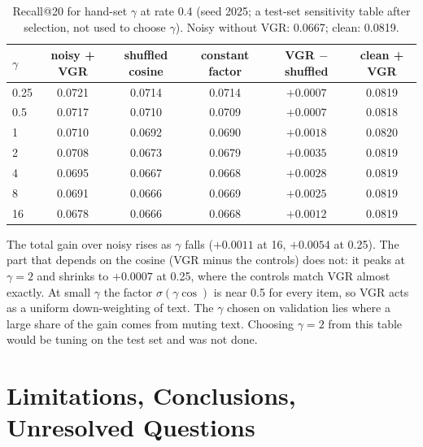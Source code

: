 \documentclass[conference]{IEEEtran}
\begin{document}
\begin{table}[!t]
\centering\footnotesize
\caption{Recall@20 for hand-set $\gamma$ at rate 0.4 (seed 2025; a test-set sensitivity table after selection, not used to choose $\gamma$). Noisy without VGR: 0.0667; clean: 0.0819.}
\label{tab:gamma}
\begin{tabular}{@{}lccccc@{}}
\toprule
$\gamma$ & noisy + VGR & shuffled cosine & constant factor & VGR $-$ shuffled & clean + VGR \\
\midrule
0.25 & 0.0721 & 0.0714 & 0.0714 & $+0.0007$ & 0.0819 \\
0.5 & 0.0717 & 0.0710 & 0.0709 & $+0.0007$ & 0.0818 \\
1 & 0.0710 & 0.0692 & 0.0690 & $+0.0018$ & 0.0820 \\
2 & 0.0708 & 0.0673 & 0.0679 & $+0.0035$ & 0.0819 \\
4 & 0.0695 & 0.0667 & 0.0668 & $+0.0028$ & 0.0819 \\
8 & 0.0691 & 0.0666 & 0.0669 & $+0.0025$ & 0.0819 \\
16 & 0.0678 & 0.0666 & 0.0668 & $+0.0012$ & 0.0819 \\
\bottomrule
\end{tabular}
\end{table}

The total gain over noisy rises as $\gamma$ falls ($+0.0011$ at 16, $+0.0054$ at 0.25). The part that depends on the cosine (VGR minus the controls) does not: it peaks at $\gamma = 2$ and shrinks to $+0.0007$ at 0.25, where the controls match VGR almost exactly. At small $\gamma$ the factor $\sigma(\gamma\cos)$ is near 0.5 for every item, so VGR acts as a uniform down-weighting of text. The $\gamma$ chosen on validation lies where a large share of the gain comes from muting text. Choosing $\gamma = 2$ from this table would be tuning on the test set and was not done.

\section{Limitations, Conclusions, Unresolved Questions}
\end{document}
